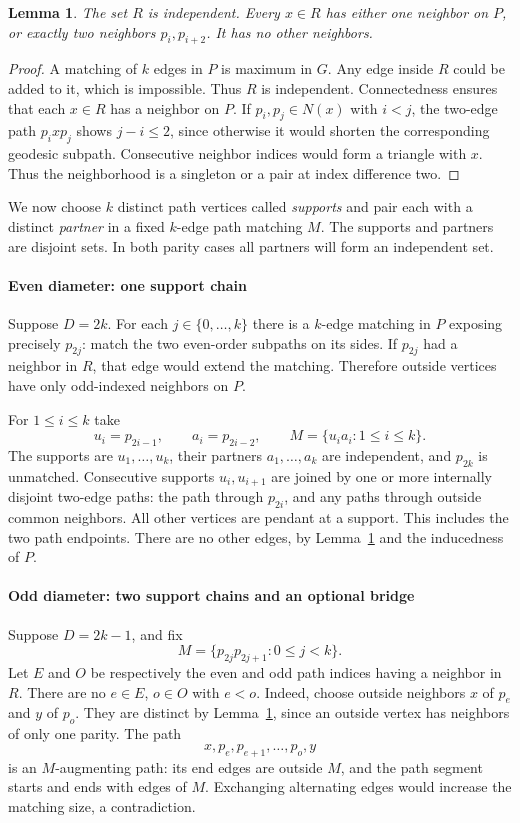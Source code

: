 \documentclass[11pt,a4paper]{article}
\newtheorem{lemma}[theorem]{Lemma}
\theoremstyle{definition}\newtheorem{definition}[theorem]{Definition}
\theoremstyle{remark}\newtheorem{remark}[theorem]{Remark}
\begin{document}
\begin{lemma}\label{late:geodesic:lem:outside}
The set $R$ is independent. Every $x\in R$ has either one neighbor on
$P$, or exactly two neighbors $p_i,p_{i+2}$. It has no other neighbors.
\end{lemma}
\begin{proof}
A matching of $k$ edges in $P$ is maximum in $G$. Any edge inside $R$
could be added to it, which is impossible. Thus $R$ is independent.
Connectedness ensures that each $x\in R$ has a neighbor on $P$.
If $p_i,p_j\in N(x)$ with $i<j$, the two-edge path $p_ixp_j$ shows
$j-i\le2$, since otherwise it would shorten the corresponding geodesic
subpath. Consecutive neighbor indices would form a triangle with $x$.
Thus the neighborhood is a singleton or a pair at index difference two.
\end{proof}

We now choose $k$ distinct path vertices called \emph{supports} and
pair each with a distinct \emph{partner} in a fixed $k$-edge path matching
$M$. The supports and partners are disjoint sets. In both parity cases
all partners will form an independent set.

\paragraph{Even diameter: one support chain}
Suppose $D=2k$. For each $j\in\{0,\ldots,k\}$ there is a $k$-edge
matching in $P$ exposing precisely $p_{2j}$: match the two even-order
subpaths on its sides. If $p_{2j}$ had a neighbor in $R$, that edge would
extend the matching. Therefore outside vertices have only odd-indexed
neighbors on $P$.

For $1\le i\le k$ take
\[
 u_i=p_{2i-1},\qquad a_i=p_{2i-2},\qquad
 M=\{u_ia_i:1\le i\le k\}.
\]
The supports are $u_1,\ldots,u_k$, their partners $a_1,\ldots,a_k$ are
independent, and $p_{2k}$ is unmatched. Consecutive supports $u_i,u_{i+1}$
are joined by one or more internally disjoint two-edge paths: the path
through $p_{2i}$, and any paths through outside common neighbors.
All other vertices are pendant at a support. This includes the two path
endpoints. There are no other edges, by Lemma~\ref{late:geodesic:lem:outside} and the
inducedness of $P$.

\paragraph{Odd diameter: two support chains and an optional bridge}
Suppose $D=2k-1$, and fix
\[
 M=\{p_{2j}p_{2j+1}:0\le j<k\}.
\]
Let $E$ and $O$ be respectively the even and odd path indices having a
neighbor in $R$. There are no $e\in E$, $o\in O$ with $e<o$. Indeed,
choose outside neighbors $x$ of $p_e$ and $y$ of $p_o$. They are distinct
by Lemma~\ref{late:geodesic:lem:outside}, since an outside vertex has neighbors of only
one parity. The path
\[
 x,p_e,p_{e+1},\ldots,p_o,y
\]
is an $M$-augmenting path: its end edges are outside $M$, and the path
segment starts and ends with edges of $M$. Exchanging alternating edges
would increase the matching size, a contradiction.
\end{document}
